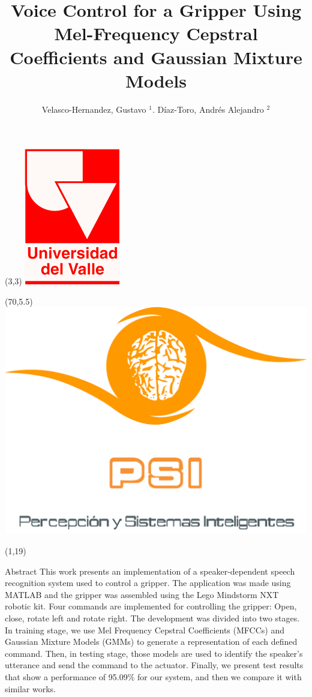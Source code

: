\documentclass[final]{beamer}
\title{Voice Control for a Gripper Using Mel-Frequency Cepstral Coefficients and Gaussian Mixture Models}
\author{Velasco-Hernandez, Gustavo $^{1}$. D\'{i}az-Toro, Andr\'{e}s Alejandro $^{2}$}
\institute{Perception and Intelligent Systems Research Group\\
	School of Electric and Electronics Engineering\\
	Universidad del Valle}
\date{}
\begin{document}
\begin{frame}{}

\begin{textblock}{5}(3,3)
\includegraphics[width=0.10\paperwidth]{figs/univalle.png}
\end{textblock}
\begin{textblock}{5}(70,5.5)
\includegraphics[width=0.15\paperwidth]{figs/psilogo3.png}
\end{textblock}


\begin{textblock}{39.5}(1,19)
\begin{block}{Abstract}
This work presents an implementation of a speaker-dependent speech recognition system used to control a gripper. The application was made using MATLAB and the gripper was assembled using the Lego Mindstorm NXT robotic kit. Four commands are implemented for controlling the gripper: Open, close, rotate left and rotate right. The development was divided into two stages. In training stage, we use Mel Frequency Cepstral Coefficients (MFCCs) and Gaussian Mixture Models (GMMs) to generate a representation of each defined command. Then, in testing stage, those models are used to identify the speaker’s utterance and send the command to the actuator. Finally, we present test results that show a performance of 95.09\% for our system, and then we compare it with similar works.
\end{block}


\end{textblock}
\end{frame}
\end{document}
